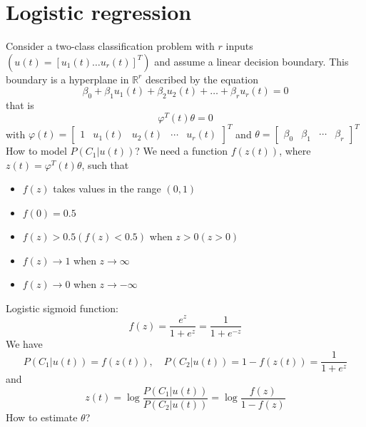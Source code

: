 \documentclass{book}
\begin{document}
\section{Logistic regression}
Consider a two-class classification problem with $r$ inputs $(u(t)=[u_1(t)\dots u_r(t)]^T)$ and assume a linear decision boundary. This boundary is a hyperplane in $\mathbb{R}^r$ described by the equation 
\[
    \beta_0+ \beta_1 u_1(t) + \beta_2u_2(t) +\dots + \beta_ru_r(t) = 0
\]
that is 
\[
    \varphi^T(t)\theta=0
\]
with $\varphi(t)=\begin{bmatrix}
    1 & u_1(t) & u_2(t) & \cdots & u_r(t)
\end{bmatrix}^T $ and $\theta=\begin{bmatrix}
    \beta_0 & \beta_1 & \cdots & \beta_r
\end{bmatrix}^T$
How to model $P(C_1|u(t))$?
We need a function $f(z(t))$, where $z(t) = \varphi^T(t)\theta$, such that 
\begin{itemize}
    \item $f(z)$ takes values in the range $(0,1)$
    \item $f(0)=0.5$ 
    \item $f(z)>0.5(f(z)<0.5)$ when $z>0 (z>0)$
    \item $f(z)\to 1$ when $z\to\infty$
    \item $f(z)\to 0$ when $z\to-\infty$
\end{itemize}
Logistic sigmoid function: 
\[
    f(z)=\displaystyle\frac{e^z}{1+e^z}=\displaystyle\frac{1}{1+e^{-z}}
\]
We have
\[
    P(C_1|u(t))=f(z(t)), \quad P(C_2|u(t))=1-f(z(t))=\displaystyle\frac{1}{1+e^z}
\]
and
\[
    z(t)=\log \displaystyle\frac{P(C_1|u(t))}{P(C_2|u(t))}=\log \displaystyle\frac{f(z)}{1-f(z)}
\]
How to estimate $\theta$?
\end{document}
